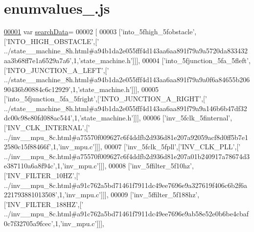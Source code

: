 \hypertarget{enumvalues__4_8js_source}{}\section{enumvalues\+\_.\+js}
\label{enumvalues__4_8js_source}

\begin{DoxyCode}
\hypertarget{enumvalues__4_8js_source.tex_l00001}{}\hyperlink{enumvalues__4_8js_ad01a7523f103d6242ef9b0451861231e}{00001} var \hyperlink{enumvalues__4_8js_ad01a7523f103d6242ef9b0451861231e}{searchData}=
00002 [
00003   [\textcolor{stringliteral}{'into\_5fhigh\_5fobstacle'},[\textcolor{stringliteral}{'INTO\_HIGH\_OBSTACLE'},[\textcolor{stringliteral}{'
      ../state\_\_machine\_8h.html#a94b1da2e055fff4d143aa6aa891f79a9a5720da833432aa3b68ff7e1a6529a7a6'},1,\textcolor{stringliteral}{'state\_machine.h'}]]],
00004   [\textcolor{stringliteral}{'into\_5fjunction\_5fa\_5fleft'},[\textcolor{stringliteral}{'INTO\_JUNCTION\_A\_LEFT'},[\textcolor{stringliteral}{'
      ../state\_\_machine\_8h.html#a94b1da2e055fff4d143aa6aa891f79a9a0f6a84655b20690436b90884c6c12929'},1,\textcolor{stringliteral}{'state\_machine.h'}]]],
00005   [\textcolor{stringliteral}{'into\_5fjunction\_5fa\_5fright'},[\textcolor{stringliteral}{'INTO\_JUNCTION\_A\_RIGHT'},[\textcolor{stringliteral}{'
      ../state\_\_machine\_8h.html#a94b1da2e055fff4d143aa6aa891f79a9a146b6b47df32dc00c98e80fd088ac544'},1,\textcolor{stringliteral}{'state\_machine.h'}]]],
00006   [\textcolor{stringliteral}{'inv\_5fclk\_5finternal'},[\textcolor{stringliteral}{'INV\_CLK\_INTERNAL'},[\textcolor{stringliteral}{'
      ../inv\_\_mpu\_8c.html#a75570f009627c6f4ddfb2d936d81e207a92059acf8d0ff5b7e12580c15f88466f'},1,\textcolor{stringliteral}{'inv\_mpu.c'}]]],
00007   [\textcolor{stringliteral}{'inv\_5fclk\_5fpll'},[\textcolor{stringliteral}{'INV\_CLK\_PLL'},[\textcolor{stringliteral}{'
      ../inv\_\_mpu\_8c.html#a75570f009627c6f4ddfb2d936d81e207a01b240917a78674d3e387110a6a8f94c'},1,\textcolor{stringliteral}{'inv\_mpu.c'}]]],
00008   [\textcolor{stringliteral}{'inv\_5ffilter\_5f10hz'},[\textcolor{stringliteral}{'INV\_FILTER\_10HZ'},[\textcolor{stringliteral}{'
      ../inv\_\_mpu\_8c.html#a91c762a5bd71461f7911dc49ee7696e9a327619f406c6b2f6a221793881013508'},1,\textcolor{stringliteral}{'inv\_mpu.c'}]]],
00009   [\textcolor{stringliteral}{'inv\_5ffilter\_5f188hz'},[\textcolor{stringliteral}{'INV\_FILTER\_188HZ'},[\textcolor{stringliteral}{'
      ../inv\_\_mpu\_8c.html#a91c762a5bd71461f7911dc49ee7696e9ab58e52e0b6be4cbaf0c7f32705a9fcec'},1,\textcolor{stringliteral}{'inv\_mpu.c'}]]],

\end{DoxyCode}
